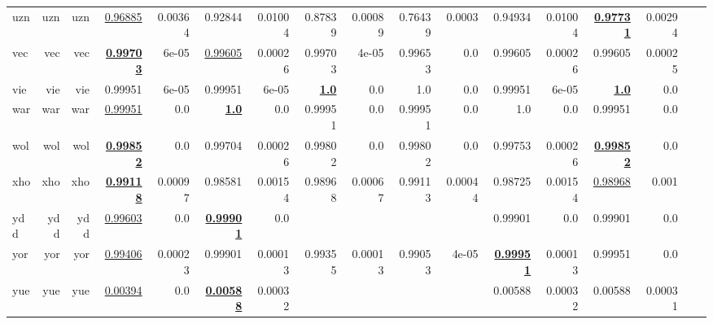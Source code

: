 \documentclass[11pt]{article}
\begin{document}
\begin{table*}[h]
{\begin{tabular}{lrrrrrrrrrrrrrrrr}
uzn         & uzn         & uzn         & \underline{0.96885}         & 0.00364         & 0.92844         & 0.01004         & 0.87839         & 0.00089         & 0.76439         & 0.0003         & 0.94934         & 0.01004         & \textbf{\underline{0.97731}}         & 0.00294         \\
vec         & vec         & vec         & \textbf{\underline{0.99703}}         & 6e-05         & \underline{0.99605}         & 0.00026         & 0.99703         & 4e-05         & 0.99653         & 0.0         & 0.99605         & 0.00026         & 0.99605         & 0.00025         \\
vie         & vie         & vie         & 0.99951         & 6e-05         & 0.99951         & 6e-05         & \textbf{\underline{1.0}}         & 0.0         & 1.0         & 0.0         & 0.99951         & 6e-05         & \textbf{\underline{1.0}}         & 0.0         \\
war         & war         & war         & \underline{0.99951}         & 0.0         & \textbf{\underline{1.0}}         & 0.0         & 0.99951         & 0.0         & 0.99951         & 0.0         & 1.0         & 0.0         & 0.99951         & 0.0         \\
wol         & wol         & wol         & \textbf{\underline{0.99852}}         & 0.0         & 0.99704         & 0.00026         & 0.99802         & 0.0         & 0.99802         & 0.0         & 0.99753         & 0.00026         & \textbf{\underline{0.99852}}         & 0.0         \\
xho         & xho         & xho         & \textbf{\underline{0.99118}}         & 0.00097         & 0.98581         & 0.00154         & 0.98968         & 0.00067         & 0.99113         & 0.00044         & 0.98725         & 0.00154         & \underline{0.98968}         & 0.001         \\
ydd         & ydd         & ydd         & \underline{0.99603}         & 0.0         & \textbf{\underline{0.99901}}         & 0.0         &         &         &         &         & 0.99901         & 0.0         & 0.99901         & 0.0         \\
yor         & yor         & yor         & \underline{0.99406}         & 0.00023         & 0.99901         & 0.00013         & 0.99355         & 0.00013         & 0.99053         & 4e-05         & \textbf{\underline{0.99951}}         & 0.00013         & 0.99951         & 0.0         \\
yue         & yue         & yue         & \underline{0.00394}         & 0.0         & \textbf{\underline{0.00588}}         & 0.00032         &         &         &         &         & 0.00588         & 0.00032         & 0.00588         & 0.00031         \\

\end{tabular}}
\end{table*}
\end{document}
